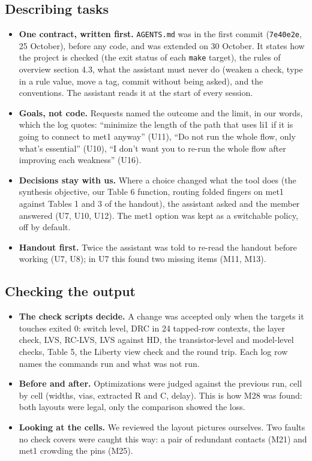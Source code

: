 \documentclass[10pt,a4paper]{article}
\newcommand{\code}[1]{\texttt{#1}}
\begin{document}
\subsection{Describing tasks}
\begin{itemize}
\item \textbf{One contract, written first.} \code{AGENTS.md} was in the first commit (\code{7e40e2e}, 25 October), before any code, and was extended on 30 October. It states how the project is checked (the exit status of each \code{make} target), the rules of overview section 4.3, what the assistant must never do (weaken a check, type in a rule value, move a tag, commit without being asked), and the conventions. The assistant reads it at the start of every session.
\item \textbf{Goals, not code.} Requests named the outcome and the limit, in our words, which the log quotes: ``minimize the length of the path that uses li1 if it is going to connect to met1 anyway'' (U11), ``Do not run the whole flow, only what's essential'' (U10), ``I don't want you to re-run the whole flow after improving each weakness'' (U16).
\item \textbf{Decisions stay with us.} Where a choice changed what the tool does (the synthesis objective, our Table 6 function, routing folded fingers on met1 against Tables 1 and 3 of the handout), the assistant asked and the member answered (U7, U10, U12). The met1 option was kept as a switchable policy, off by default.
\item \textbf{Handout first.} Twice the assistant was told to re-read the handout before working (U7, U8); in U7 this found two missing items (M11, M13).
\end{itemize}

\subsection{Checking the output}
\begin{itemize}
\item \textbf{The check scripts decide.} A change was accepted only when the targets it touches exited 0: switch level, DRC in 24 tapped-row contexts, the layer check, LVS, RC-LVS, LVS against HD, the transistor-level and model-level checks, Table 5, the Liberty view check and the round trip. Each log row names the commands run and what was not run.
\item \textbf{Before and after.} Optimizations were judged against the previous run, cell by cell (widths, vias, extracted R and C, delay). This is how M28 was found: both layouts were legal, only the comparison showed the loss.
\item \textbf{Looking at the cells.} We reviewed the layout pictures ourselves. Two faults no check covers were caught this way: a pair of redundant contacts (M21) and met1 crowding the pins (M25).
\end{itemize}
\end{document}
